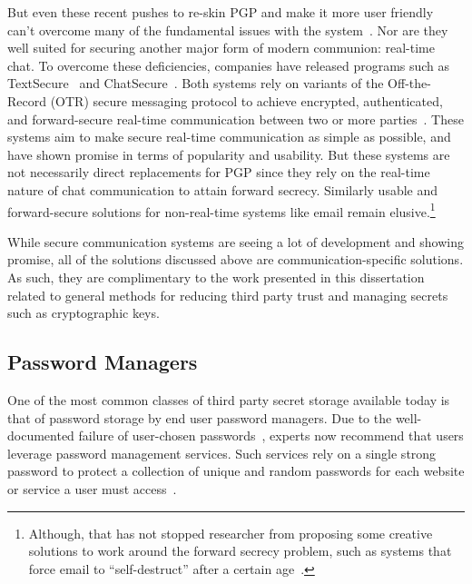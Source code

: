 But even these recent pushes to re-skin PGP and make it more user
friendly can't overcome many of the fundamental issues with the
system~\cite{green-pgp}. Nor are they well suited for securing another
major form of modern communion: real-time chat. To overcome these
deficiencies, companies have released programs such as
TextSecure~\cite{openwhisper} and ChatSecure~\cite{chatsecure}. Both
systems rely on variants of the Off-the-Record (OTR) secure messaging
protocol to achieve encrypted, authenticated, and forward-secure
real-time communication between two or more parties~\cite{otr-v3,
  borisov2004, goldberg2009}. These systems aim to make secure
real-time communication as simple as possible, and have shown promise
in terms of popularity and usability. But these systems are not
necessarily direct replacements for PGP since they rely on the
real-time nature of chat communication to attain forward
secrecy. Similarly usable and forward-secure solutions for
non-real-time systems like email remain elusive.\footnote{Although,
  that has not stopped researcher from proposing some creative
  solutions to work around the forward secrecy problem, such as
  systems that force email to ``self-destruct'' after a certain
  age~\cite{geambasu2009}.}

While secure communication systems are seeing a lot of development and
showing promise, all of the solutions discussed above are
communication-specific solutions. As such, they are complimentary to
the work presented in this dissertation related to general methods for
reducing third party trust and managing secrets such as cryptographic
keys.

\subsection{Password Managers}

One of the most common classes of third party secret storage available
today is that of password storage by end user password managers. Due
to the well-documented failure of user-chosen
passwords~\cite{mazurek2013, goodin-bible, goodin-passwords,
  singer2013}, experts now recommend that users leverage password
management services. Such services rely on a single strong password to
protect a collection of unique and random passwords for each website
or service a user must access~\cite{schneier-passwords,
  krebs-passwords, brodkin-passman}.

